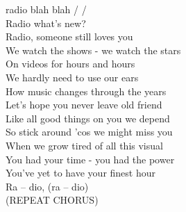   radio blah blah / /\\
  Radio what's new?\\
  Radio, someone still loves you\\
  We watch the shows - we watch the stars\\
  On videos for hours and hours\\
  We hardly need to use our ears\\
  How music changes through the years\\
  Let's hope you never leave old friend\\
  Like all good things on you we depend\\
  So stick around 'cos we might miss you\\
  When we grow tired of all this visual\\
  You had your time - you had the power\\
  You've yet to have your finest hour\\
  Ra – dio, (ra – dio)\\
  (REPEAT CHORUS)\\
